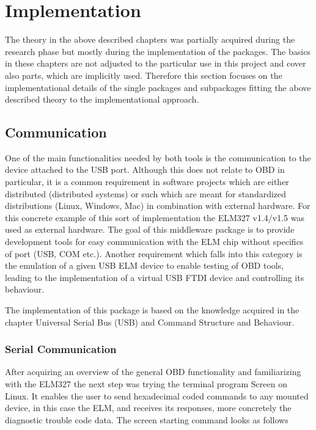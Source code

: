 
\chapter{Implementation}
\label{sec:impl}
The theory in the above described chapters was partially acquired during the research phase but mostly during the implementation of the packages. 
The basics in these chapters are not adjusted to the particular use in this project and cover also parts, which are implicitly used. 
Therefore this section focuses on the implementational details of the single packages and subpackages fitting the above described theory to the 
implementational approach.

\section{Communication}
\label{sec:comm}
One of the main functionalities needed by both tools is the communication to the device attached to the USB port. Although this does not relate 
to OBD in particular, it is a common requirement in software projects which are either distributed (distributed systems) or  such which are 
meant for standardized distributions (Linux, Windows, Mac) in combination with external hardware. For this concrete example of this sort of 
implementation the ELM327 v1.4/v1.5 was used as external hardware. The goal of this middleware package is to provide development tools for easy 
communication with the ELM chip without specifics of port (USB, COM etc.). Another requirement which falls into this category is the emulation 
of a given USB ELM device to enable testing of OBD tools, leading to the implementation of a virtual USB FTDI device and controlling its behaviour.

The implementation of this package is based on the knowledge acquired in the chapter Universal Serial Bus (USB) and Command Structure and Behaviour.

\subsection{Serial Communication}
\label{sec:serialComm}
After acquiring an overview of the general OBD functionality and familiarizing with the ELM327 the next step was trying the terminal program 
Screen on Linux. It enables the user to send hexadecimal coded commands to any mounted device, in this case the ELM, and receives its responses, 
more concretely the diagnostic trouble code data. The screen starting command looks as follows

